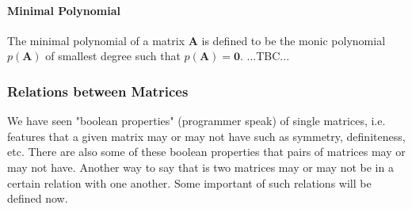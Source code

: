 


\paragraph{Minimal Polynomial}
The minimal polynomial of a matrix $\mathbf{A}$ is defined to be the monic polynomial $p(\mathbf{A})$ of smallest degree such that  $p(\mathbf{A}) = \mathbf{0}$. ...TBC...



\subsubsection{Relations between Matrices}
We have seen "boolean properties" (programmer speak) of single matrices, i.e. features that a given matrix may or may not have such as symmetry, definiteness, etc. There are also some of these boolean properties that pairs of matrices may or may not have. Another way to say that is two matrices may or may not be in a certain relation with one another. Some important of such relations will be defined now.


